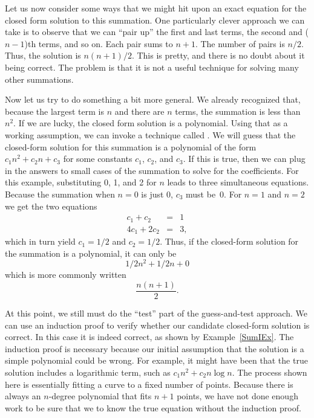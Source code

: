 Let us now consider some ways that we might hit upon an exact equation
for the closed form solution to this summation.
One particularly clever approach we can take is to
observe that we can ``pair up'' the first and last terms,
the second and (\(n-1\))th terms, and so on.
Each pair sums to \(n+1\).
The number of pairs is \(n/2\).
Thus, the solution is \(n(n+1)/2\).
This is pretty, and there is no doubt about it being correct.
The problem is that it is not a useful technique for solving many
other summations.

Now let us try to do something a bit more general.
We already recognized that, because the largest term is \(n\) and
there are \(n\) terms, the summation is less than \(n^2\).
If we are lucky, the closed form solution is a polynomial.
Using that as a working assumption,
we can invoke a technique called .
We will guess that the closed-form solution for this summation is a
polynomial of the form \(c_1 n^2 + c_2 n + c_3\) for some constants
\(c_1\), \(c_2\), and \(c_3\).
If this is true, then we can plug in the answers to small cases of the
summation to solve for the coefficients.
For this example, substituting 0, 1, and 2 for \(n\) leads to three
simultaneous equations.
Because the summation when \(n = 0\) is just 0, \(c_3\) must be~0.
For \(n = 1\) and \(n = 2\) we get the two equations
\begin{eqnarray*}
c_1 + c_2     & = & 1 \\
4 c_1 + 2 c_2 & = & 3,
\end{eqnarray*}
\noindent which in turn yield \(c_1 = 1/2\) and \(c_2 = 1/2\).
Thus, if the closed-form solution for the summation is a polynomial,
it can only be
\[1/2 n^2 + 1/2 n + 0\]
which is more commonly written
\[\frac{n(n+1)}{2}.\]

At this point, we still must do the ``test'' part of the
guess-and-test approach.
We can use an induction proof to verify whether our
candidate closed-form solution is correct.
In this case it is indeed correct, as shown by Example~\ref{SumIEx}.
The induction proof is necessary because our initial assumption that
the solution is a simple polynomial could be wrong.
For example, it might have been that the true solution
includes a logarithmic term, such as
\(c_1n^2 + c_2 n \log n\).
The process shown here is essentially fitting a curve to a fixed
number of points.
Because there is always an \(n\)-degree polynomial that fits \(n+1\)
points, we have not done enough work to be sure that we to know the
true equation without the induction proof.

